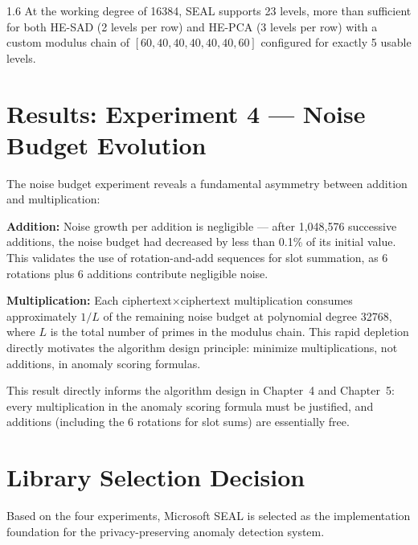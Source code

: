 \begin{spacing}{1.6}
At the working degree of 16384, SEAL supports 23 levels, more than sufficient
for both HE-SAD (2 levels per row) and HE-PCA (3 levels per row) with a custom
modulus chain of $[60,40,40,40,40,40,60]$ configured for exactly 5 usable
levels.

\section{Results: Experiment 4 --- Noise Budget Evolution}

The noise budget experiment reveals a fundamental asymmetry between addition
and multiplication:

\textbf{Addition:} Noise growth per addition is negligible --- after
1,048,576 successive additions, the noise budget had decreased by less than
0.1\% of its initial value. This validates the use of rotation-and-add
sequences for slot summation, as 6 rotations plus 6 additions contribute
negligible noise.

\textbf{Multiplication:} Each ciphertext$\times$ciphertext multiplication
consumes approximately $1/L$ of the remaining noise budget at polynomial degree
32768, where $L$ is the total number of primes in the modulus chain. This rapid
depletion directly motivates the algorithm design principle: minimize
multiplications, not additions, in anomaly scoring formulas.

This result directly informs the algorithm design in Chapter~4 and Chapter~5:
every multiplication in the anomaly scoring formula must be justified, and
additions (including the 6 rotations for slot sums) are essentially free.

\section{Library Selection Decision}

Based on the four experiments, Microsoft SEAL is selected as the implementation
foundation for the privacy-preserving anomaly detection system.


\end{spacing}
